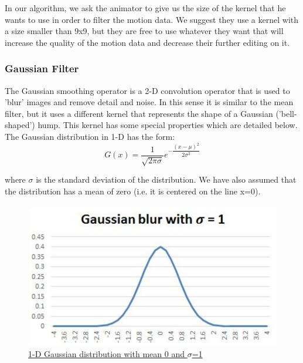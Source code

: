 In our algorithm, we ask the animator to give us the size of the kernel that he wants to use in order to filter the motion data. We suggest they use a kernel with a size smaller than 9x9, but they are free to use whatever they want that will increase the quality of the motion data and decrease their further editing on it.

\subsubsection*{Gaussian Filter}
The Gaussian smoothing operator is a 2-D convolution operator that is used to 'blur' images and remove detail and noise. In this sense it is similar to the mean filter, but it uses a different kernel that represents the shape of a Gaussian ('bell-shaped') hump. This kernel has some special properties which are detailed below.\\
The Gaussian distribution in 1-D has the form:
$$ G(x) = \dfrac{1}{\sqrt{2\pi\sigma}} e^{-\dfrac{(x-\mu)^2}{2\sigma^2}}$$

where $\sigma$ is the standard deviation of the distribution. We have also assumed that the distribution has a mean of zero (i.e. it is centered on the line x=0). 

\begin{figure}[h]
	\centering
	\includegraphics[width=1\textwidth]{figures/Implementation/Gaussian1D.png}
	\captionsetup{labelformat=empty}
	\caption{\href{https://fiveko.com/assets/pics/math/gauss1d_shape.jpg}
	{ 1-D Gaussian distribution with mean 0 and $\sigma$=1}}
\end{figure}

